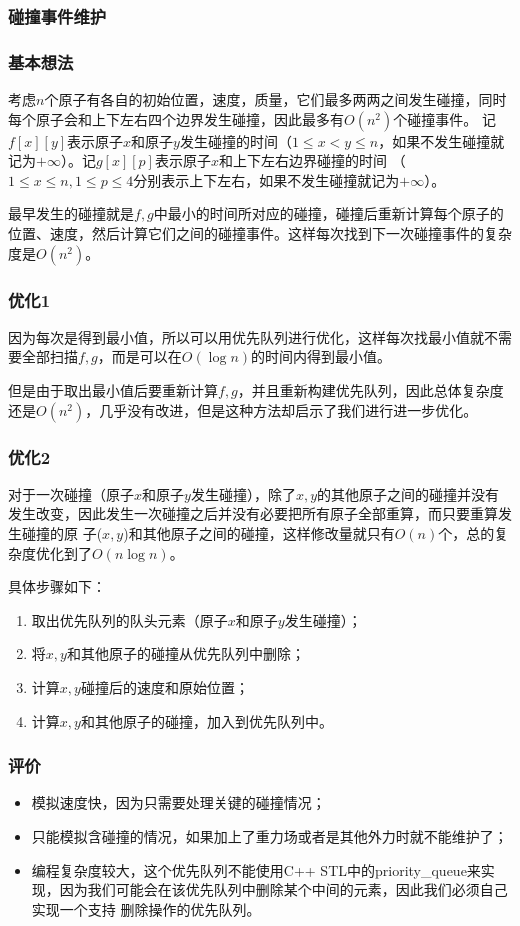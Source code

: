 ﻿\documentclass{article}
\begin{document}
	\subsubsection{碰撞事件维护}
	\subsubsection*{基本想法}
	\indent 考虑$n$个原子有各自的初始位置，速度，质量，它们最多两两之间发生碰撞，同时每个原子会和上下左右四个边界发生碰撞，因此最多有$O(n^2)$个碰撞事件。
	记$f[x][y]$表示原子$x$和原子$y$发生碰撞的时间（$1 \leq x < y \leq n$，如果不发生碰撞就记为$+\infty$）。记$g[x][p]$表示原子$x$和上下左右边界碰撞的时间
	（$1 \leq x \leq n, 1\leq p \leq 4$分别表示上下左右，如果不发生碰撞就记为$+\infty$）。\par
	最早发生的碰撞就是$f,g$中最小的时间所对应的碰撞，碰撞后重新计算每个原子的位置、速度，然后计算它们之间的碰撞事件。这样每次找到下一次碰撞事件的复杂度是$O(n^2)$。
	\subsubsection*{优化1}
	因为每次是得到最小值，所以可以用优先队列进行优化，这样每次找最小值就不需要全部扫描$f,g$，而是可以在$O(\log n)$的时间内得到最小值。\par
	但是由于取出最小值后要重新计算$f,g$，并且重新构建优先队列，因此总体复杂度还是$O(n^2)$，几乎没有改进，但是这种方法却启示了我们进行进一步优化。
	\subsubsection*{优化2}
	对于一次碰撞（原子$x$和原子$y$发生碰撞），除了$x,y$的其他原子之间的碰撞并没有发生改变，因此发生一次碰撞之后并没有必要把所有原子全部重算，而只要重算发生碰撞的原
	子($x,y$)和其他原子之间的碰撞，这样修改量就只有$O(n)$个，总的复杂度优化到了$O(n\log n)$。\par
	具体步骤如下：
	\begin{enumerate}
		\item 取出优先队列的队头元素（原子$x$和原子$y$发生碰撞）；
		\item 将$x,y$和其他原子的碰撞从优先队列中删除；
		\item 计算$x,y$碰撞后的速度和原始位置；
		\item 计算$x,y$和其他原子的碰撞，加入到优先队列中。
	\end{enumerate}
	\subsubsection{评价}
	\begin{itemize}
		\item 模拟速度快，因为只需要处理关键的碰撞情况；
		\item 只能模拟含碰撞的情况，如果加上了重力场或者是其他外力时就不能维护了；
		\item 编程复杂度较大，这个优先队列不能使用C++ STL中的priority\_queue来实现，因为我们可能会在该优先队列中删除某个中间的元素，因此我们必须自己实现一个支持
		删除操作的优先队列。
	\end{itemize}
\end{document}

